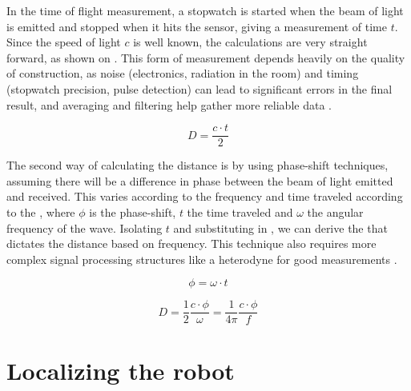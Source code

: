 In the time of flight measurement, a stopwatch is started when the beam of light is emitted and stopped when it hits the sensor, giving a measurement of time $t$. Since the speed of light $c$ is well known, the calculations are very straight forward, as shown on . This form of measurement depends heavily on the quality of construction, as noise (electronics, radiation in the room) and timing (stopwatch precision, pulse detection) can lead to significant errors in the final result, and averaging and filtering help gather more reliable data \cite{siegwart2011introduction}.

\begin{equation} \label{eq:d}
D = \frac{c \cdot t}{2}
\end{equation}

The second way of calculating the distance is by using phase-shift techniques, assuming there will be a difference in phase between the beam of light emitted and received. This varies according to the frequency and time traveled according to the , where $\phi$ is the phase-shift, $t$ the time traveled and $\omega$ the angular frequency of the wave. Isolating $t$ and substituting in , we can derive the  that dictates the distance based on frequency. This technique also requires more complex signal processing structures like a heterodyne for good measurements \cite{siegwart2011introduction}.

\begin{equation} \label{eq:omegat}
\phi = \omega \cdot t
\end{equation}

\begin{equation} \label{eq:d2}
D = \frac{1}{2} \frac{c \cdot \phi}{\omega} = \frac{1}{4 \pi} \frac{c \cdot \phi}{f}
\end{equation}



\section{Localizing the robot}

